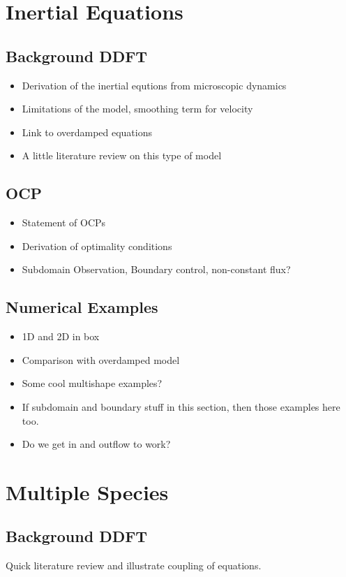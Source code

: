 \documentclass[11pt, a4paper]{article}
\theoremstyle{definition}
\begin{document}
	\section{Inertial Equations}
	\subsection{Background DDFT}
		\begin{itemize}
			\item Derivation of the inertial equtions from microscopic dynamics
			\item Limitations of the model, smoothing term for velocity
			\item Link to overdamped equations
			\item A little literature review on this type of model
		\end{itemize}
	
	\subsection{OCP}
		\begin{itemize}
			\item Statement of OCPs 
			\item Derivation of optimality conditions
			\item Subdomain Observation, Boundary control, non-constant flux?
		\end{itemize}
	\subsection{Numerical Examples}
		\begin{itemize}
			\item 1D and 2D in box
			\item Comparison with overdamped model
			\item Some cool multishape examples?
			\item If subdomain and boundary stuff in this section, then those examples here too.
			\item Do we get in and outflow to work?
		\end{itemize}

	\section{Multiple Species}
	\subsection{Background DDFT}
	Quick literature review and illustrate coupling of equations.
\end{document}
